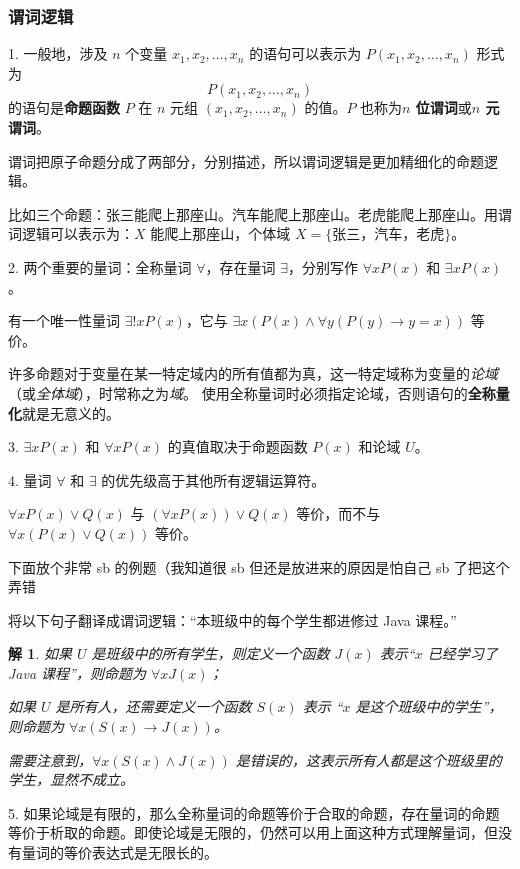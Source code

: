 \documentclass[normal,cyan]{elegantnote}
\newtheorem{solve}{解}
\begin{document}
\subsubsection{谓词逻辑}
1. 一般地，涉及 $n$ 个变量 $x_1, x_2, \dots, x_n$ 的语句可以表示为 $\displaystyle P(x_1, x_2, \dots, x_n)$ 形式为 $$P(x_1, x_2, \dots, x_n)$$ 的语句是\textbf{命题函数} $P$ 在 $n$ 元组 $(x_1, x_2, \dots, x_n)$ 的值。$P$ 也称为\textbf{$n$ 位谓词}或\textbf{$n$ 元谓词}。
\begin{remark}
    谓词把原子命题分成了两部分，分别描述，所以谓词逻辑是更加精细化的命题逻辑。

    比如三个命题：张三能爬上那座山。汽车能爬上那座山。老虎能爬上那座山。用谓词逻辑可以表示为：$X$ 能爬上那座山，个体域 $X = \{\text{张三，汽车，老虎}\}$。
\end{remark}
2. 两个重要的量词：全称量词 $\forall$，存在量词 $\exists$，分别写作 $\forall xP(x)$ 和 $\exists xP(x)$。
\begin{note}
    有一个唯一性量词 $\exists ! xP(x)$，它与 $\exists x(P(x) \wedge \forall y(P(y) \to y = x))$ 等价。

    许多命题对于变量在某一特定域内的所有值都为真，这一特定域称为变量的\emph{论域}（或\emph{全体域}），时常称之为\emph{域}。
    使用全称量词时必须指定论域，否则语句的\textbf{全称量化}就是无意义的。
\end{note}
3. $\exists xP(x)$ 和 $\forall xP(x)$ 的真值取决于命题函数 $P(x)$ 和论域 $U$。

4. 量词 $\forall$ 和 $\exists$ 的优先级高于其他所有逻辑运算符。
\begin{example}
    $\forall xP(x)\vee Q(x)$ 与 $(\forall xP(x)) \vee Q(x)$ 等价，而不与 $\forall x(P(x) \vee Q(x))$ 等价。
\end{example}
下面放个非常 sb 的例题（我知道很 sb 但还是放进来的原因是怕自己 sb 了把这个弄错
\begin{example}
    将以下句子翻译成谓词逻辑：“本班级中的每个学生都进修过 Java 课程。”
\end{example}
\begin{solve}
    如果 $U$ 是班级中的所有学生，则定义一个函数 $J(x)$ 表示“$x$ 已经学习了 Java 课程”，则命题为 $\forall xJ(x)$；

    如果 $U$ 是所有人，还需要定义一个函数 $S(x)$ 表示 “$x$ 是这个班级中的学生”，则命题为 $\forall x(S(x) \to J(x))$。

    需要注意到，$\forall x(S(x) \wedge J(x))$ 是错误的，这表示所有人都是这个班级里的学生，显然不成立。
\end{solve}
5. 如果论域是有限的，那么全称量词的命题等价于合取的命题，存在量词的命题等价于析取的命题。即使论域是无限的，仍然可以用上面这种方式理解量词，但没有量词的等价表达式是无限长的。
\end{document}
